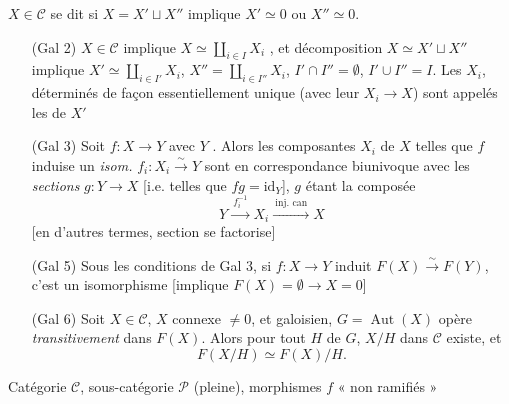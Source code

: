 \documentclass[11pt,a4paper]{article}
\begin{document}
$X \in \mathcal{C}$ se dit   si
$X = X' \sqcup X''$ implique $X' \simeq 0$ ou $X'' \simeq 0$.

\begin{enumerate}
\item[(Gal 2)] $X \in \mathcal{C}$ \struck{\ill{}} implique
$X \simeq \coprod_{i \in I} X_i$ , et
 \ill{} décomposition $X \simeq X' \sqcup X''$ implique
$X' \simeq \coprod_{i \in I'} X_i$, $X'' = \coprod_{i \in I''} X_i$,
$I' \cap I'' = \emptyset$, $I' \cup I'' = I$. Les $X_i$, déterminés de
façon essentiellement unique (avec leur $X_i \to X$)
sont appelés les   de
$X'$ \marginal{[N.B. $X = 0 \Longleftrightarrow I = \emptyset$]}

\item[(Gal 3)] Soit $f : X \to Y$ avec $Y$ 
. Alors les composantes  $X_i$ de $X$
telles que $f$ induise un \emph{isom.} $f_i : X_i \xrightarrow{\sim} Y$ sont en
correspondance biunivoque avec les \emph{sections} $g : Y \to X$
 [i.e. telles que $fg = \mathrm{id}_Y$], $g$ étant la composée
\struck{\ill{}}
\[
Y \xrightarrow{\ f_i^{-1}\ } X_i \xrightarrow{\ \text{inj. can}\ } X
\]
[en d'autres termes,  \ill{} section se factorise]
\marginal{[N.B. il suffit de la vérifier si $X = Z \times Y$, $f = p_2$]}

\item[(Gal 5)] Sous les conditions de Gal 3, si \struck{\ill{}} $f : X \to Y$
induit $F(X) \xrightarrow{\sim} F(Y)$, c'est un isomorphisme
[implique $F(X) = \emptyset \to X = 0$]

\item[(Gal 6)] Soit $X \in \mathcal{C}$, $X$ connexe $\neq 0$, et galoisien,
  $G = \operatorname{Aut}(X)$ opère
\emph{transitivement} dans $F(X)$. \struck{\ill{}} Alors pour tout
 $H$ de $G$, $X/H$ dans $\mathcal{C}$ existe, et
\[
F(X/H) \simeq F(X)/H.
\]
\end{enumerate}


Catégorie $\mathcal{C}$, sous-catégorie $\mathcal{P}$ (pleine), morphismes $f$
« non ramifiés »
\end{document}
